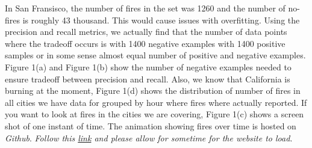 \documentclass[10pt]{article}
\begin{document}
In San Fransisco, the number of fires in the set was 1260 and the number of
no-fires is roughly 43 thousand. This would cause issues with overfitting.
Using the precision and recall metrics, we actually find that the number of
data points where the tradeoff occurs is with 1400 negative examples with 1400
positive samples or in some sense almost equal number of positive and negative
examples. Figure 1(a) and Figure 1(b) show the number of negative examples
needed to ensure tradeoff between precision and recall. Also, we know that
California is burning at the moment, Figure 1(d) shows the distribution of
number of fires in all cities we have data for grouped by hour where fires
where actually reported. If you want to look at fires in the cities we are
covering, Figure 1(c) shows a screen shot of one instant of time. The animation
showing fires over time is hosted on \textit{Github}.
\textit{Follow this
\href{https://leafyao8621.github.io/firevisualization.github.io/}{link}
and please allow for sometime for the website to load}.\par
\end{document}
